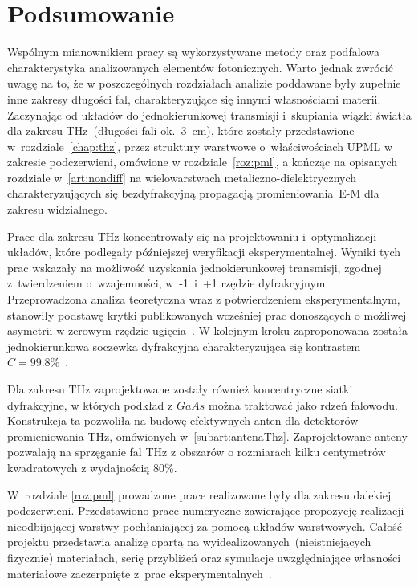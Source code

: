 \chapter{Podsumowanie}
Wspólnym mianownikiem pracy są wykorzystywane metody oraz podfalowa charakterystyka analizowanych elementów fotonicznych. Warto jednak zwrócić uwagę na to, że w poszczególnych rozdziałach analizie poddawane były zupełnie inne zakresy długości fal, charakteryzujące się innymi własnościami materii. Zaczynając od układów do jednokierunkowej transmisji i~skupiania wiązki światła dla zakresu THz~(długości fali ok.~3~cm), które zostały przedstawione w~rozdziale~\ref{chap:thz}, przez struktury warstwowe o~właściwościach UPML w zakresie podczerwieni, omówione w rozdziale~\ref{roz:pml}, a kończąc na opisanych rozdziale w~\ref{art:nondiff} na wielowarstwach metaliczno-dielektrycznych charakteryzujących się bezdyfrakcyjną propagacją promieniowania~E-M dla zakresu widzialnego.

Prace dla zakresu THz koncentrowały się na projektowaniu i~optymalizacji układów, które podlegały późniejszej weryfikacji eksperymentalnej. Wyniki tych prac wskazały na możliwość uzyskania jednokierunkowej transmisji, zgodnej z~twierdzeniem o~wzajemności, w~-1~i~+1 rzędzie dyfrakcyjnym. Przeprowadzona analiza teoretyczna wraz z potwierdzeniem eksperymentalnym, stanowiły podstawę krytki publikowanych wcześniej prac donoszących o możliwej asymetrii w zerowym rzędzie ugięcia~\cite{Stolarek:13}. W kolejnym kroku zaproponowana została jednokierunkowa soczewka dyfrakcyjna charakteryzująca się kontrastem $C=99.8\%$~\cite{Yavorskiy:14}. 

Dla zakresu THz zaprojektowane zostały również koncentryczne siatki dyfrakcyjne, w których podkład z $GaAs$ można traktować jako rdzeń falowodu. Konstrukcja ta pozwoliła na budowę efektywnych anten dla detektorów promieniowania THz, omówionych w~\ref{subart:antenaThz}. Zaprojektowane anteny pozwalają na sprzęganie fal THz z obszarów o rozmiarach kilku centymetrów kwadratowych z wydajnością  80\%.

W~rozdziale \ref{roz:pml} prowadzone prace realizowane były dla zakresu dalekiej podczerwieni. Przedstawiono prace numeryczne zawierające propozycję realizacji nieodbijającej warstwy pochłaniającej za pomocą układów warstwowych. Całość projektu przedstawia analizę opartą na wyidealizowanych~(nieistniejących fizycznie) materiałach, serię przybliżeń oraz symulacje uwzględniające własności materiałowe zaczerpnięte z~prac eksperymentalnych~\cite{ania2015,stefaniuk2015perfectly}.


